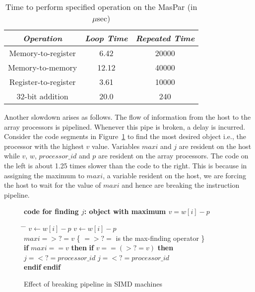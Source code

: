 \begin{enumerate}
\begin{table}
\begin{center}
\begin{tabular}{|c|c|c|} \hline \hline
{\em Operation } 	& {\em Loop Time } & {\em Repeated Time} \\ \hline
Memory-to-register	&	6.42	& 20000	\\ \hline
Memory-to-memory	&	12.12	& 40000	\\ \hline
Register-to-register	&	3.61	& 10000	\\ \hline
32-bit addition		&	20.0	& 240	\\ \hline \hline
\end{tabular}
\end{center}
\caption{Time to perform specified operation on the MasPar (in $\mu$sec)}
\label{simd_myth_bit_serial}
\end{table}

Another slowdown arises as follows.
The flow of information from the host to the array processors
is pipelined. Whenever this pipe is broken, a delay is incurred.
Consider the code segments in Figure~\ref{pipeline}
to find the most desired object
i.e., the processor with the highest $v$ value. 
Variables $maxi$ and $j$ are resident on the host while
$v$, $w$, $processor\_id$ and $p$ are resident on the array processors.
The code on the left is about 1.25 times slower than the code
to the right. 
This is because in assigning the maximum to $maxi$, a variable
resident on the host, we are forcing the host to wait for the value
of $maxi$ and hence are breaking the instruction pipeline.

\begin{figure}[hbt]
\begin{center}
{\bf code for finding $j$: object with maximum $v = w[i] - p$}
\end{center}
\begin{tabbing}
\hspace*{.25in} \= \hspace*{3.50in} \= \kill
$ v \leftarrow w[i] - p$               \> \> $ v \leftarrow w[i] - p$  \\
%
$maxi = >?= v$  \{ $= >?=$ is the max-finding operator \}  \\
%
{\bf if} $maxi == v$ {\bf then} \> \> {\bf if} $v == (>?= v)$ {\bf then} \\
%
\> $j = <?= processor\_id$  \> $j = <?= processor\_id$  \\
%
{\bf endif}  				\> \> {\bf endif} \\
\end{tabbing}
\caption{Effect of breaking pipeline in SIMD machines}
\label{pipeline}
\end{figure}


\end{enumerate}
